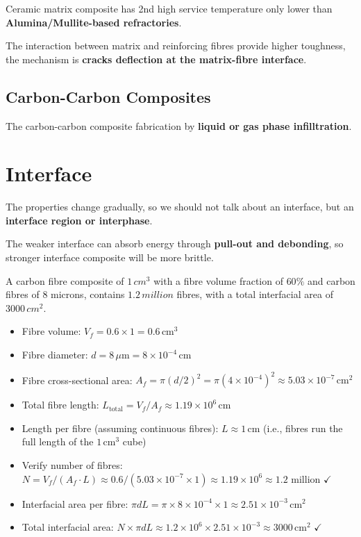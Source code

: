 \documentclass{NoteThesis/note-thesis}
\begin{document}
Ceramic matrix composite has 2nd high service temperature only lower than \textbf{Alumina/Mullite-based refractories}.

The interaction between matrix and reinforcing fibres provide higher toughness, the mechanism is \textbf{cracks deflection at the matrix-fibre interface}.

\subsection{Carbon-Carbon Composites}

The carbon-carbon composite fabrication by \textbf{liquid or gas phase infilltration}.

\section{Interface}

The properties change gradually, so we should not talk about an interface, but an \textbf{interface region or interphase}.

The weaker interface can absorb energy through \textbf{pull-out and debonding}, so stronger interface composite will be more brittle.

\begin{mynote_env}[frametitle=Example Question]
    A carbon fibre composite of $1\, cm^3$ with a fibre volume fraction of $60\%$ and carbon fibres of $8$ microns, contains $1.2\, million$ fibres, with a total interfacial area of $3000\, cm^2$.
    \begin{itemize}
        \item Fibre volume: $V_f = 0.6 \times 1 = 0.6\,\text{cm}^3$
        \item Fibre diameter: $d = 8\,\mu\text{m} = 8\times10^{-4}\,\text{cm}$
        \item Fibre cross-sectional area: $A_f = \pi(d/2)^2 = \pi(4\times10^{-4})^2 \approx 5.03\times10^{-7}\,\text{cm}^2$
        \item Total fibre length: $L_{\text{total}} = V_f / A_f \approx 1.19\times10^6\,\text{cm}$
        \item Length per fibre (assuming continuous fibres): $L \approx 1\,\text{cm}$ (i.e., fibres run the full length of the $1\,\text{cm}^3$ cube)
        \item Verify number of fibres: $N = V_f / (A_f \cdot L) \approx 0.6 / (5.03\times10^{-7} \times 1) \approx 1.19\times10^6 \approx 1.2$ million $\checkmark$
        \item Interfacial area per fibre: $\pi d L = \pi \times 8\times10^{-4} \times 1 \approx 2.51\times10^{-3}\,\text{cm}^2$
        \item Total interfacial area: $N \times \pi d L \approx 1.2\times10^6 \times 2.51\times10^{-3} \approx 3000\,\text{cm}^2$ $\checkmark$
    \end{itemize}
\end{mynote_env}
\end{document}
